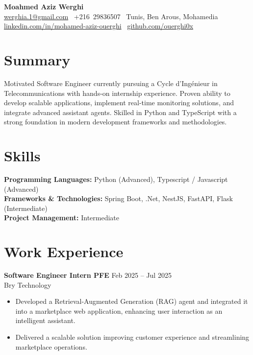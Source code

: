 \documentclass[11pt,a4paper]{article}
\begin{document}
\raggedright

{\LARGE \textbf{Moahmed Aziz Werghi}}\\[6pt]
\href{mailto:werghia.1@gmail.com}{werghia.1@gmail.com} \textbullet\ +216~29836507 \textbullet\ Tunis, Ben Arous, Mohamedia\\
\href{https://www.linkedin.com/in/mohamed-aziz-ouerghi/}{linkedin.com/in/mohamed-aziz-ouerghi} \textbullet\ 
\href{https://github.com/ouerghi0x/}{github.com/ouerghi0x}\\[12pt]

\section*{Summary}
Motivated Software Engineer currently pursuing a Cycle d'Ingénieur in Telecommunications with hands-on internship experience. Proven ability to develop scalable applications, implement real-time monitoring solutions, and integrate advanced assistant agents. Skilled in Python and TypeScript with a strong foundation in modern development frameworks and methodologies.

\section*{Skills}
\textbf{Programming Languages:} Python (Advanced), Typescript / Javascript (Advanced)\\
\textbf{Frameworks \& Technologies:} Spring Boot, .Net, NestJS, FastAPI, Flask (Intermediate)\\
\textbf{Project Management:} Intermediate

\section*{Work Experience}

\textbf{Software Engineer Intern PFE} \hfill Feb 2025 -- Jul 2025\\
Bry Technology\\
\begin{itemize}
    \item Developed a Retrieval-Augmented Generation (RAG) agent and integrated it into a marketplace web application, enhancing user interaction as an intelligent assistant.
    \item Delivered a scalable solution improving customer experience and streamlining marketplace operations.
\end{itemize}
\end{document}
